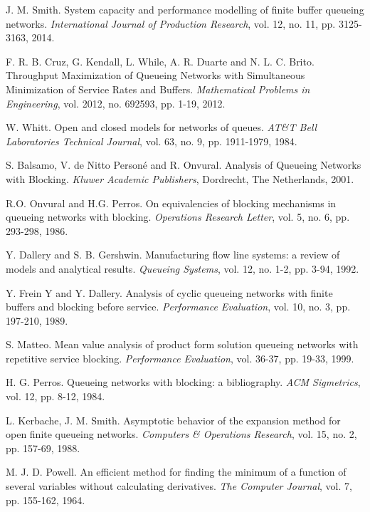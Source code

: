\documentclass[twoside]{article}
\begin{document}
\begin{multicols}{2}
\begin{thebibliography}{9}
  J. M. Smith. System capacity and performance modelling of finite buffer queueing networks. \textit{International Journal of Production Research}, vol. 12, no. 11, pp. 3125-3163, 2014.

  F. R. B. Cruz, G. Kendall, L. While, A. R. Duarte and N. L. C. Brito. Throughput Maximization of Queueing Networks with Simultaneous Minimization of Service Rates and Buffers. \textit{Mathematical Problems in Engineering}, vol. 2012, no. 692593, pp. 1-19, 2012.

	W. Whitt. Open and closed models for networks of queues. \textit{AT\&T Bell Laboratories Technical Journal}, vol. 63, no. 9, pp. 1911-1979, 1984.
	
	S. Balsamo, V. de Nitto Personé and R. Onvural. Analysis of Queueing Networks with Blocking. \textit{Kluwer Academic Publishers}, Dordrecht, The Netherlands, 2001.	
	
    R.O. Onvural and H.G. Perros. On equivalencies of blocking mechanisms in queueing networks with blocking. \textit{Operations Research Letter}, vol. 5, no. 6, pp. 293-298, 1986.

	Y. Dallery and S. B. Gershwin. Manufacturing flow line systems: a review of models and analytical results. \textit{Queueing Systems}, vol. 12, no. 1-2, pp. 3-94, 1992.

	Y. Frein Y and Y. Dallery. Analysis of cyclic queueing networks with finite buffers and blocking before service. \textit{Performance Evaluation}, vol. 10, no. 3, pp. 197-210, 1989.

	S. Matteo. Mean value analysis of product form solution queueing networks with repetitive service blocking. \textit{Performance Evaluation}, vol. 36-37, pp. 19-33, 1999.
	
	H. G. Perros. Queueing networks with blocking: a bibliography. \textit{ACM Sigmetrics}, vol. 12, pp. 8-12, 1984.

	L. Kerbache, J. M. Smith. Asymptotic behavior of the expansion method for open finite queueing networks. \textit{Computers \& Operations Research}, vol. 15, no. 2, pp. 157-69, 1988.

	M. J. D. Powell. An efficient method for finding the minimum of a function of several variables without calculating derivatives. \textit{The Computer Journal}, vol. 7, pp. 155-162, 1964.
	

\end{thebibliography}
\end{multicols}
\end{document}
